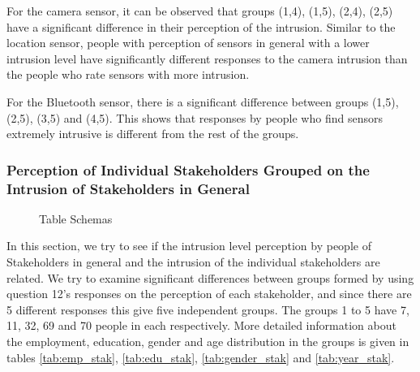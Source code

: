 For the camera sensor, it can be observed that groups (1,4), (1,5), (2,4), (2,5) have a significant difference in their perception of the intrusion.
Similar to the location sensor, people with perception of sensors in general with a lower intrusion level have significantly different responses to the camera intrusion than the people who rate sensors with more intrusion.

For the Bluetooth sensor, there is a significant difference between groups (1,5), (2,5), (3,5) and (4,5). This shows that responses by people who find sensors extremely intrusive is different from the rest of the groups.


\subsubsection{Perception of Individual Stakeholders Grouped on the Intrusion of Stakeholders in General}

\begin{figure}[htp]
\caption{Table Schemas}
\label{fig:st3}
\end{figure}

In this section, we try to see if the intrusion level perception by people of Stakeholders in general and the intrusion of the individual stakeholders are related. We try to examine significant differences between groups formed by using question 12's responses on the perception of
each stakeholder, and since there are 5 different responses this give five independent groups. The groups 1 to 5 have 7, 11, 32, 69 and 70 people in each respectively. More detailed information about the employment, education, gender and age distribution in the groups is given in tables \ref{tab:emp_stak}, \ref{tab:edu_stak}, \ref{tab:gender_stak} and \ref{tab:year_stak}.

